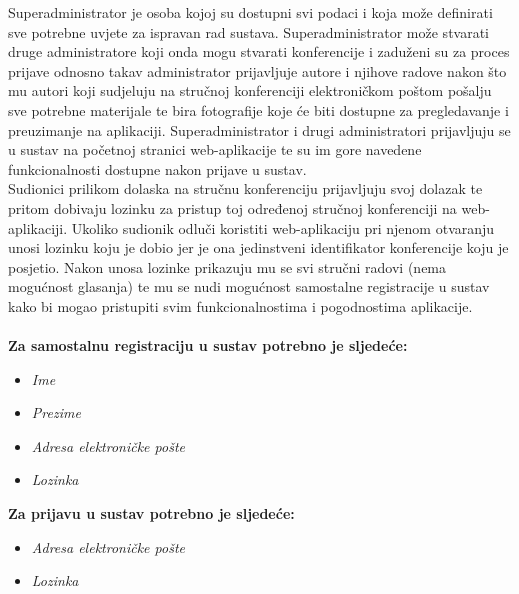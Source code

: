 		Superadministrator je osoba kojoj su dostupni svi podaci i koja može definirati sve potrebne uvjete za ispravan rad sustava. Superadministrator može stvarati druge administratore koji onda mogu stvarati konferencije i zaduženi su za proces prijave odnosno takav administrator prijavljuje autore i njihove radove nakon što mu autori koji sudjeluju na stručnoj konferenciji elektroničkom poštom pošalju sve potrebne materijale te bira fotografije koje će biti dostupne za pregledavanje i preuzimanje na aplikaciji. Superadministrator i drugi administratori prijavljuju se u sustav na početnoj stranici web-aplikacije te su im gore navedene funkcionalnosti dostupne nakon prijave u sustav.\\
		
		Sudionici prilikom dolaska na stručnu konferenciju prijavljuju svoj dolazak te pritom dobivaju lozinku za pristup toj određenoj stručnoj konferenciji na web-aplikaciji. Ukoliko sudionik odluči koristiti web-aplikaciju pri njenom otvaranju unosi lozinku koju je dobio jer je ona jedinstveni identifikator konferencije koju je posjetio. Nakon unosa lozinke prikazuju mu se svi stručni radovi (nema mogućnost glasanja) te mu se nudi mogućnost samostalne registracije u sustav kako bi mogao pristupiti svim funkcionalnostima i pogodnostima aplikacije.\\\\

        \textbf{Za samostalnu registraciju u sustav potrebno je sljedeće:}
        \begin{itemize}
        	\item \textit{Ime}
        	\item \textit{Prezime}
        	\item \textit{Adresa elektroničke pošte}
        	\item \textit{Lozinka}
        \end{itemize}

		\textbf{Za prijavu u sustav potrebno je sljedeće:}
        \begin{itemize}
            \item \textit{Adresa elektroničke pošte}
            \item \textit{Lozinka}
        \end{itemize}
        

